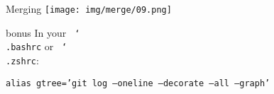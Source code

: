 \documentclass[usenames,dvipsnames,handout,9pt]{beamer}
\begin{document}
\begin{frame}{Merging}
\texttt{[image: img/merge/09.png]}
\end{frame}



















\begin{frame}[fragile]{bonus}
  In your \texttt{~\char`\\.bashrc} or \texttt{~\char`\\.zshrc}:

  \texttt{alias gtree='git log --oneline --decorate --all --graph'}
\end{frame}



\end{document}
